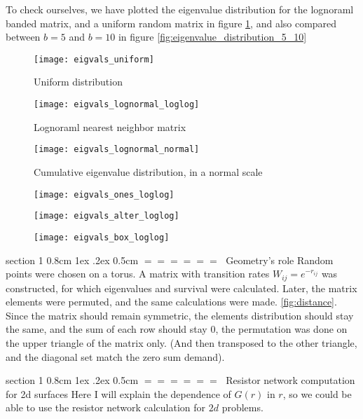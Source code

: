 \documentclass[onecolumn,fleqn,notitlepage,secnumarabic]{revtex4}
\makeatletter
\def\section{%
  \@startsection
    {section}%
    {1}%
    {\z@}%
    {0.8cm \@plus1ex \@minus .2ex}%
    {0.5cm}%
    {\Large\bf $=\!=\!=\!=\!=\!=\;$}%
}%
\renewcommand{\includegraphics}[2][]{\ \\ \ FIGURE: \ \\ \ }
\makeatother
\begin{document}
To check ourselves, we have plotted the eigenvalue distribution for the lognoraml banded matrix, and a uniform random matrix in figure \ref{fig:eigenvalue_distribution}, and also compared between $b=5$ and $b=10$ in figure \ref{fig:eigenvalue_distribution_5_10}
\begin{figure}[H]
    {\texttt{[image: eigvals\_uniform]}}
\caption{Uniform distribution}
    \label{fig:eigenvalue_distribution}
\end{figure}
\begin{figure}[H]
    {\texttt{[image: eigvals\_lognormal\_loglog]}}
    \caption{Lognoraml nearest neighbor matrix}

\end{figure}
\begin{figure}[H]
    \texttt{[image: eigvals\_lognormal\_normal]}
    \caption{Cumulative eigenvalue distribution, in a normal scale}
\end{figure}
\begin{figure}[H]
    \texttt{[image: eigvals\_ones\_loglog]}
\end{figure}
\begin{figure}[H]
    \texttt{[image: eigvals\_alter\_loglog]}
\end{figure}
\begin{figure}[H]
    \texttt{[image: eigvals\_box\_loglog]}
\end{figure}

\section{Geometry's role} \label{sec:geometry}
Random points were chosen on a torus. A matrix with transition rates $W_{ij} = e^{-r_{ij}}$ was constructed, for which eigenvalues and survival were calculated. Later, the matrix elements were permuted, and the same calculations were made. \ref{fig:distance}. Since the matrix should remain symmetric, the elements distribution should stay the same, and the sum of each row should stay $0$, the permutation was done on the upper triangle of the matrix only. (And then transposed to the other triangle, and the diagonal set match the zero sum demand).

\section{Resistor network computation for 2d surfaces}
Here I will explain the dependence of $G(r)$ in $r$, so we could be able to use the resistor network calculation for $2d$ problems.
\end{document}
